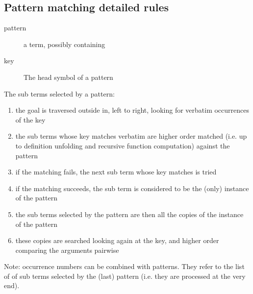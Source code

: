 \begin{landscape}
\begin{small}
\begin{multicols*}{3}[\begin{center}\section*{}\end{center}]




\subsection*{Pattern matching detailed rules}

\begin{description}
\item[pattern] a term, possibly containing \C{\_}
\item[key] The head symbol of a pattern
\end{description}

The sub terms selected by a pattern:
\begin{enumerate}
\item the goal is traversed outside in, left to right, looking for
      verbatim occurrences of the key
\item the sub terms whose key matches verbatim are higher order
      matched (i.e. up to definition unfolding and recursive function
      computation) against the pattern
\item if the matching fails, the next sub term whose key matches is tried
\item if the matching succeeds, the sub term is considered to be the
      (only) instance of the pattern
\item the sub terms selected by the pattern are then all the copies of the
      instance of the pattern
\item these copies are searched looking again at the key, and higher order 
      comparing the arguments pairwise
\end{enumerate}

Note: occurrence numbers can be combined with patterns. They refer 
to the list of of sub terms selected by the (last) pattern (i.e. they
are processed at the very end).


\end{multicols*}
\end{small}
\end{landscape}
